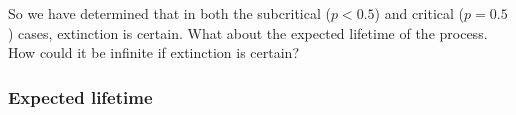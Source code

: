 \documentclass[11pt,a4paper]{article}
\theoremstyle{plain}
\theoremstyle{definition}
\begin{document}
            
            
            
            

\vspace{10pt}
\noindent
So we have determined that in both the subcritical ($p < 0.5$) and critical ($p = 0.5$) cases, extinction is certain. What about the expected lifetime of the process. How could it be infinite if extinction is certain?




\subsubsection{Expected lifetime}
\end{document}
